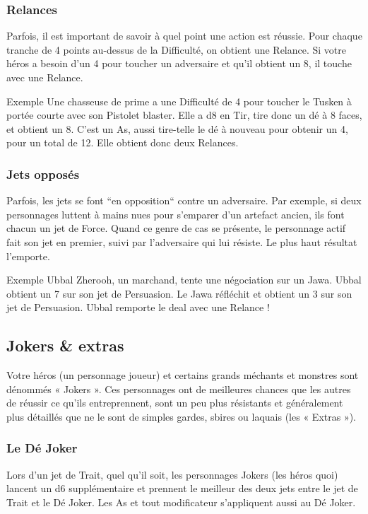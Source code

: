 \subsubsection{Relances}
Parfois, il est important de savoir à quel point une action est réussie. Pour chaque tranche de 4 points au-dessus de la Difficulté, on obtient une Relance. Si votre héros a besoin d’un 4 pour toucher un adversaire et qu’il obtient un 8, il touche avec une Relance.

\begin{commentbox}{Exemple}
Une chasseuse de prime a une Difficulté de 4 pour toucher le Tusken à portée courte avec son Pistolet blaster. Elle a d8 en Tir, tire donc un dé à 8 faces, et obtient un 8. C’est un As, aussi tire-telle le dé à nouveau pour obtenir un 4, pour un total de 12. Elle obtient donc deux Relances.
\end{commentbox}

\subsubsection{Jets opposés}
Parfois, les jets se font “en opposition“ contre un adversaire. Par exemple, si deux personnages luttent à mains nues pour s’emparer d’un artefact ancien, ils font chacun un jet de Force. Quand ce genre de cas se présente, le personnage actif fait son jet en premier, suivi par l’adversaire qui lui résiste. Le plus haut résultat l’emporte.

\begin{commentbox}{Exemple}
Ubbal Zherooh, un marchand, tente une négociation sur un Jawa. Ubbal obtient un 7 sur son jet de Persuasion. Le Jawa réfléchit et obtient un 3 sur son jet de Persuasion. Ubbal remporte le deal avec une Relance !
\end{commentbox}


\subsection{Jokers \& extras}
Votre héros (un personnage joueur) et certains grands méchants et monstres sont dénommés « Jokers ». Ces personnages ont de meilleures chances que les autres de réussir ce qu’ils entreprennent, sont un peu plus résistants et généralement plus détaillés que ne le sont de simples gardes, sbires ou laquais (les « Extras »).

\subsubsection{Le Dé Joker}
Lors d’un jet de Trait, quel qu’il soit, les personnages Jokers (les héros quoi) lancent un d6 supplémentaire et prennent le meilleur des deux jets entre le jet de Trait et le Dé Joker. Les As et tout modificateur s’appliquent aussi au Dé Joker.

